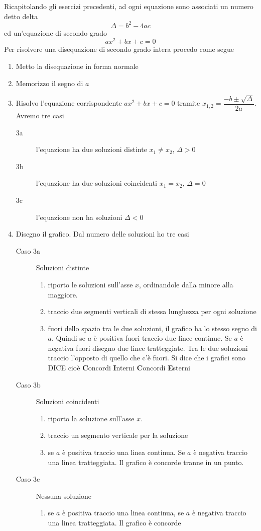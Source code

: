Ricapitolando gli esercizi precedenti, ad ogni equazione sono associati un numero detto delta \[\Delta=b^2-4ac\] ed un'equazione di secondo grado\[ax^2+bx+c=0\]  Per risolvere una disequazione di secondo grado intera procedo come segue
\begin{enumerate}
	\item Metto la disequazione in forma normale
	\item Memorizzo il segno di $a$
	\item Risolvo l'equazione corrispondente $ax^2+bx+c=0$ tramite 
	$x_{1,2}=\dfrac{-b\pm\sqrt{\Delta}}{2a}$. Avremo tre casi
	\begin{description}
		\item[3a] l'equazione ha due soluzioni distinte $x_1\neq x_2$, $\Delta>0$
		\item[3b] l'equazione ha due soluzioni coincidenti $x_1= x_2$, $\Delta=0$
		\item[3c] l'equazione non ha soluzioni $\Delta<0$
	\end{description}
\item Disegno il grafico. Dal numero delle soluzioni ho tre casi
\begin{description}
	\item[Caso 3a] Soluzioni distinte\begin{enumerate}
		\item riporto le soluzioni sull'asse $x$, ordinandole dalla minore  alla maggiore.
		\item traccio due segmenti verticali di stessa lunghezza per ogni soluzione
		\item fuori dello spazio tra le due soluzioni, il grafico ha lo stesso segno di $a$. Quindi se $a$ è positiva fuori traccio due linee continue. Se $a$ è negativa fuori  disegno due linee tratteggiate. Tra le due soluzioni traccio l'opposto di quello che c'è fuori. Si dice che i grafici sono DICE cioè \textbf{C}oncordi \textbf{I}nterni \textbf{C}oncordi \textbf{E}sterni
	\end{enumerate}
\item[Caso 3b] Soluzioni coincidenti
\begin{enumerate}
	\item riporto la soluzione sull'asse $x$.
	\item traccio un segmento verticale per la soluzione
	\item  se $a$ è positiva traccio una linea continua. Se $a$ è negativa  traccio una linea tratteggiata. Il grafico è concorde tranne in un punto.
\end{enumerate} 
\item[Caso 3c] Nessuna soluzione
\begin{enumerate}
	\item se $a$ è positiva traccio una linea continua, se $a$ è negativa traccio una linea tratteggiata. Il grafico è concorde
\end{enumerate}
\end{description}
\end{enumerate}
